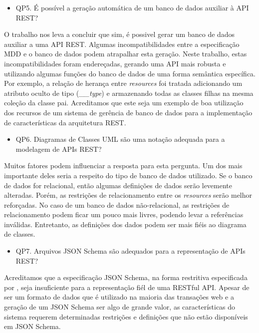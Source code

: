 \begin{itemize}
	\item QP5. É possível a geração automática de um banco de dados auxiliar à API REST?
\end{itemize}

O trabalho nos leva a concluir que sim, é possivel gerar um banco de dados auxiliar a uma API REST. Algumas incompatibilidades entre a especificação MDD e o banco de dados podem atrapalhar esta geração. Neste trabalho, estas incompatibilidades foram endereçadas, gerando uma API mais robusta e utilizando algumas funções do banco de dados de uma forma semântica específica. Por exemplo, a relação de herança entre \textit{resources} foi tratada adicionando um atributo oculto de tipo (\textit{\_\_type}) e armazenando todas as classes filhas na mesma coleção da classe pai. Acreditamos que este seja um exemplo de boa utilização dos recursos de um sistema de gerência de banco de dados para a implementação de características da arquitetura REST.

\begin{itemize}
	\item QP6. Diagramas de Classes UML são uma notação adequada para a modelagem de APIs REST?
\end{itemize}

Muitos fatores podem influenciar a resposta para esta pergunta. Um dos mais importante deles seria a respeito do tipo de banco de dados utilizado. Se o banco de dados for relacional, então algumas definições de dados serão levemente alteradas. Porém, as restrições de relacionamento entre os \textit{resources} serão melhor reforçadas. No caso de um banco de dados não-relacional, as restrições de relacionamento podem ficar um pouco mais livres, podendo levar a referências inválidas. Entretanto, as definições dos dados podem ser mais fiéis ao diagrama de classes.

\begin{itemize}
	\item QP7. Arquivos JSON Schema são adequados para a representação de APIs REST?
\end{itemize}

Acreditamos que a especificação JSON Schema, na forma restritiva especificada por , seja insuficiente para a representação fiél de uma RESTful API. Apesar de ser um formato de dados que é utilizado na maioria das transações web e a geração de um JSON Schema ser algo de grande valor, as características do sistema requerem determinadas restrições e definições que não estão disponíveis em JSON Schema.

